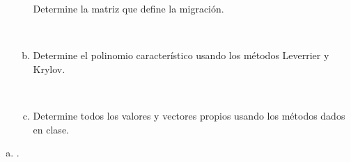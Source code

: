 \begin{frame}
\begin{enumerate}
\begin{enumerate}[a)]
			            Determine la matriz que define la migración.

			            \

			      \item

			            Determine el polinomio característico usando los
			            métodos Leverrier y Krylov.

			            \

			      \item

			            Determine todos los valores y vectores propios
			            usando los métodos dados en clase.
		      \end{enumerate}
	\end{enumerate}

	\begin{solution}
		\begin{enumerate}[a)]
			\item

			      .
		\end{enumerate}
	\end{solution}
\end{frame}